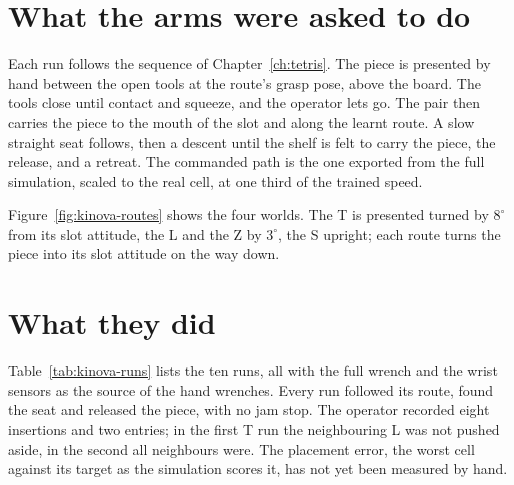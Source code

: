 \section{What the arms were asked to do}

Each run follows the sequence of Chapter~\ref{ch:tetris}. The piece is presented by hand between the open tools at the route's grasp pose, above the board. The tools close until contact and squeeze, and the operator lets go. The pair then carries the piece to the mouth of the slot and along the learnt route. A slow straight seat follows, then a descent until the shelf is felt to carry the piece, the release, and a retreat. The commanded path is the one exported from the full simulation, scaled to the real cell, at one third of the trained speed.


Figure~\ref{fig:kinova-routes} shows the four worlds. The T is presented turned by $8^\circ$ from its slot attitude, the L and the Z by $3^\circ$, the S upright; each route turns the piece into its slot attitude on the way down.

\section{What they did}

Table~\ref{tab:kinova-runs} lists the ten runs, all with the full wrench and the wrist sensors as the source of the hand wrenches. Every run followed its route, found the seat and released the piece, with no jam stop. The operator recorded eight insertions and two entries; in the first T run the neighbouring L was not pushed aside, in the second all neighbours were. The placement error, the worst cell against its target as the simulation scores it, has not yet been measured by hand.

\begin{table}[htbp]\centering\footnotesize
\caption{The runs of 21--22 October 2026. Asked and measured: the median normal force per hand while carrying (target of the convex program and wrist sensor). Side: the largest horizontal force the environment exerted on the piece. Twist: the largest rotation the twist channel added to a flange. Solve: median time of one convex program on the robot computer.}\label{tab:kinova-runs}
\setlength{\tabcolsep}{4pt}
\resizebox{\textwidth}{!}{}
\end{table}

